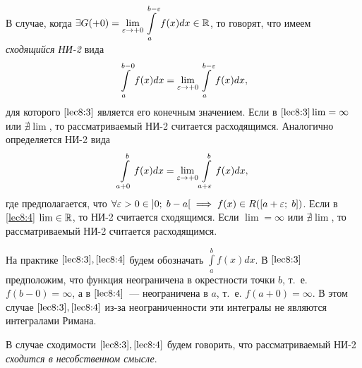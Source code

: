 \documentclass[../../main.tex]{subfiles}
\begin{document}
В случае, когда $\exists G(+0) = \underset{\varepsilon \to +0}\lim 
\displaystyle\int\limits_{a}^{b - \varepsilon}f(x)dx \in \mathbb{R}$, то говорят, что имеем 
\emph{сходящийся НИ-2} вида
\begin{equation}\label{lec8:3}
\displaystyle\int\limits_{a}^{b - 0}f(x)dx = \underset{\varepsilon \to +0}\lim 
\displaystyle\int\limits_{a}^{b - \varepsilon}f(x)dx,
\end{equation}
для которого $\eqref{lec8:3}$ является его конечным значением. Если в 
$\eqref{lec8:3} \lim = \infty$ или $\nexists \lim$, то рассматриваемый НИ-2 
считается расходящимся. Аналогично определяется НИ-2 вида
\begin{equation} \label{lec8:4}
 \int\limits_{a + 0}^{b}f(x)dx = \underset{\varepsilon \to +0}\lim \int\limits_{a + 
 \varepsilon}^{b}f(x)dx,
\end{equation}
где предполагается, что $\forall \varepsilon > 0 \in \left]0;\; b - a\right[ \implies 
f(x) \in R(\left[a + \varepsilon;\; b\right])$. Если в \eqref{lec8:4} ${\lim \in \mathbb{R}}$, 
то НИ-2 считается сходящимся. Если $\lim = \infty$ или $\nexists \lim$, то 
рассматриваемый НИ-2 считается расходящимся.

На практике $\eqref{lec8:3}, \eqref{lec8:4}$ будем обозначать 
$\displaystyle\int\limits_{a}^{b}f(x)dx$. В $\eqref{lec8:3}$ предположим, что 
функция неограничена в окрестности точки $b$, т.~е. $f(b - 0) = \infty$, а в 
$\eqref{lec8:4}$~--- неограничена в $a$, т.~е. $f(a + 0) = \infty$. В этом случае 
$\eqref{lec8:3}, \eqref{lec8:4}$ из-за неограниченности эти интегралы не являются интегралами 
Римана.

В случае сходимости $\eqref{lec8:3}, \eqref{lec8:4}$ будем говорить, что 
рассматриваемый НИ-2 \emph{сходится в несобственном смысле}.
\end{document}
